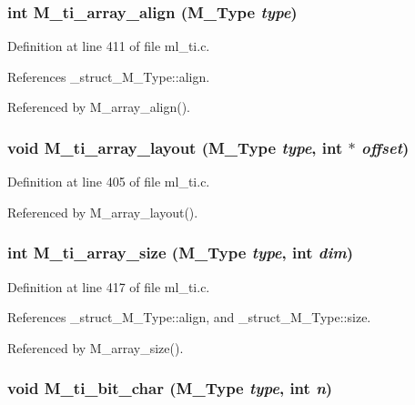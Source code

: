 \subsubsection{\setlength{\rightskip}{0pt plus 5cm}int M\_\-ti\_\-array\_\-align (\bf{M\_\-Type} {\em type})}\label{m__ti_8h_4e70504bb940f8768cb2441101ef07f1}




Definition at line 411 of file ml\_\-ti.c.

References \_\-struct\_\-M\_\-Type::align.

Referenced by M\_\-array\_\-align().
\subsubsection{\setlength{\rightskip}{0pt plus 5cm}void M\_\-ti\_\-array\_\-layout (\bf{M\_\-Type} {\em type}, int $\ast$ {\em offset})}\label{m__ti_8h_6d11f943ead088d249d81176f6abfc49}




Definition at line 405 of file ml\_\-ti.c.

Referenced by M\_\-array\_\-layout().
\subsubsection{\setlength{\rightskip}{0pt plus 5cm}int M\_\-ti\_\-array\_\-size (\bf{M\_\-Type} {\em type}, int {\em dim})}\label{m__ti_8h_ad0eb837b512262771ac1abd03d4d5df}




Definition at line 417 of file ml\_\-ti.c.

References \_\-struct\_\-M\_\-Type::align, and \_\-struct\_\-M\_\-Type::size.

Referenced by M\_\-array\_\-size().
\subsubsection{\setlength{\rightskip}{0pt plus 5cm}void M\_\-ti\_\-bit\_\-char (\bf{M\_\-Type} {\em type}, int {\em n})}\label{m__ti_8h_9e66e626af7942131a48194624bd721e}




